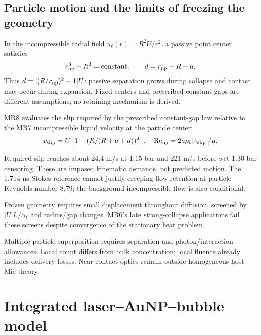 \documentclass[11pt,a4paper]{article}
\begin{document}
\subsection{Particle motion and the limits of freezing the geometry}
In the incompressible radial field $u_\ell(r)=R^2U/r^2$, a passive point center satisfies
\begin{equation}r_{\rm np}^3-R^3=\text{constant},\qquad d=r_{\rm np}-R-a.
\end{equation}
Thus $\dot d=[(R/r_{\rm np})^2-1]U$: passive separation grows during collapse and contact may occur during expansion. Fixed centers and prescribed constant gaps are different assumptions; no retaining mechanism is derived.

MR8 evaluates the slip required by the prescribed constant-gap law relative to the MR7 incompressible liquid velocity at the particle center:
\begin{equation}v_{\rm slip}=U\left[1-(R/(R+a+d))^2\right],\quad
\mathrm{Re}_{\rm np}=2a\rho_0|v_{\rm slip}|/\mu.
\end{equation}
\begin{center}\small\end{center}
Required slip reaches about 24.4 m/s at 1.15 bar and 221 m/s before wet 1.30 bar censoring. These are imposed kinematic demands, not predicted motion. The 1.714 ns Stokes reference cannot justify creeping-flow retention at particle Reynolds number 8.79; the background incompressible flow is also conditional.

Frozen geometry requires small displacement throughout diffusion, screened by $|U|L/\alpha_\ell$ and radius/gap changes. MR6's late strong-collapse applications fail these screens despite convergence of the stationary heat problem.

Multiple-particle superposition requires separation and photon/interaction allowances. Local count differs from bulk concentration; local fluence already includes delivery losses. Near-contact optics remain outside homogeneous-host Mie theory.
\clearpage
\section{Integrated laser--AuNP--bubble model}
\end{document}
